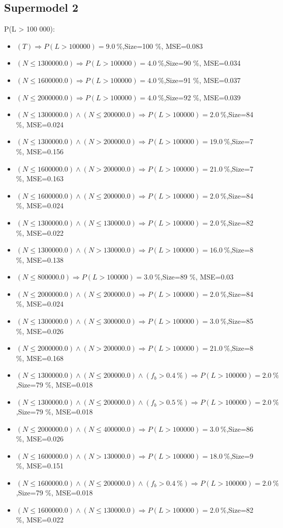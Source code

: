 \documentclass[numbered]{CSL}
\begin{document}
\subsection{Supermodel 2}
P(L > 100 000):
\begin{itemize}
\item $(T) \Rightarrow P(L > 100 000) = 9.0~\%$,\hfill Size=100 \%, MSE=0.083
\item $(N \leq 1300000.0) \Rightarrow P(L > 100 000) = 4.0~\%$,\hfill Size=90 \%, MSE=0.034
\item $(N \leq 1600000.0) \Rightarrow P(L > 100 000) = 4.0~\%$,\hfill Size=91 \%, MSE=0.037
\item $(N \leq 2000000.0) \Rightarrow P(L > 100 000) = 4.0~\%$,\hfill Size=92 \%, MSE=0.039
\item $(N \leq 1300000.0) \land (N \leq 200000.0) \Rightarrow P(L > 100 000) = 2.0~\%$,\hfill Size=84 \%, MSE=0.024
\item $(N \leq 1300000.0) \land (N > 200000.0) \Rightarrow P(L > 100 000) = 19.0~\%$,\hfill Size=7 \%, MSE=0.156
\item $(N \leq 1600000.0) \land (N > 200000.0) \Rightarrow P(L > 100 000) = 21.0~\%$,\hfill Size=7 \%, MSE=0.163
\item $(N \leq 1600000.0) \land (N \leq 200000.0) \Rightarrow P(L > 100 000) = 2.0~\%$,\hfill Size=84 \%, MSE=0.024
\item $(N \leq 1300000.0) \land (N \leq 130000.0) \Rightarrow P(L > 100 000) = 2.0~\%$,\hfill Size=82 \%, MSE=0.022
\item $(N \leq 1300000.0) \land (N > 130000.0) \Rightarrow P(L > 100 000) = 16.0~\%$,\hfill Size=8 \%, MSE=0.138
\item $(N \leq 800000.0) \Rightarrow P(L > 100 000) = 3.0~\%$,\hfill Size=89 \%, MSE=0.03
\item $(N \leq 2000000.0) \land (N \leq 200000.0) \Rightarrow P(L > 100 000) = 2.0~\%$,\hfill Size=84 \%, MSE=0.024
\item $(N \leq 1300000.0) \land (N \leq 300000.0) \Rightarrow P(L > 100 000) = 3.0~\%$,\hfill Size=85 \%, MSE=0.026
\item $(N \leq 2000000.0) \land (N > 200000.0) \Rightarrow P(L > 100 000) = 21.0~\%$,\hfill Size=8 \%, MSE=0.168
\item $(N \leq 1300000.0) \land (N \leq 200000.0) \land (f_b > 0.4~\%) \Rightarrow P(L > 100 000) = 2.0~\%$,\hfill Size=79 \%, MSE=0.018
\item $(N \leq 1300000.0) \land (N \leq 200000.0) \land (f_b > 0.5~\%) \Rightarrow P(L > 100 000) = 2.0~\%$,\hfill Size=79 \%, MSE=0.018
\item $(N \leq 2000000.0) \land (N \leq 400000.0) \Rightarrow P(L > 100 000) = 3.0~\%$,\hfill Size=86 \%, MSE=0.026
\item $(N \leq 1600000.0) \land (N > 130000.0) \Rightarrow P(L > 100 000) = 18.0~\%$,\hfill Size=9 \%, MSE=0.151
\item $(N \leq 1600000.0) \land (N \leq 200000.0) \land (f_b > 0.4~\%) \Rightarrow P(L > 100 000) = 2.0~\%$,\hfill Size=79 \%, MSE=0.018
\item $(N \leq 1600000.0) \land (N \leq 130000.0) \Rightarrow P(L > 100 000) = 2.0~\%$,\hfill Size=82 \%, MSE=0.022
\end{itemize}
\end{document}
